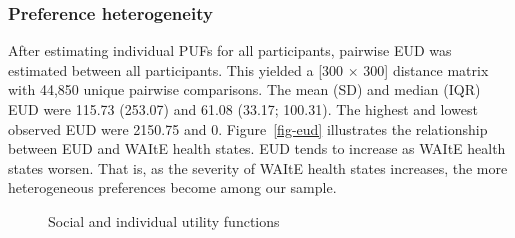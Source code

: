 \documentclass[
  letterpaper,
  DIV=11,
  numbers=noendperiod]{scrartcl}
\begin{document}
\subsubsection{Preference heterogeneity}\label{preference-heterogeneity}

After estimating individual PUFs for all participants, pairwise EUD was
estimated between all participants. This yielded a {[}300 \(\times\)
300{]} distance matrix with 44,850 unique pairwise comparisons. The mean
(SD) and median (IQR) EUD were 115.73 (253.07) and 61.08 (33.17;
100.31). The highest and lowest observed EUD were 2150.75 and 0.
Figure~\ref{fig-eud} illustrates the relationship between EUD and WAItE
health states. EUD tends to increase as WAItE health states worsen. That
is, as the severity of WAItE health states increases, the more
heterogeneous preferences become among our sample.

\begin{figure}


\caption{\label{fig-sufplain}Social and individual utility functions}

\end{figure}%
\end{document}
